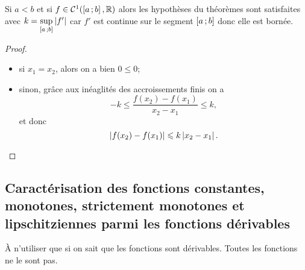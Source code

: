 Si $a < b$ et si $f \in \mathcal{C}^{1}(\left[ a \, ;  b \right], \mathbb{R})$ alors les hypothèses du théorèmes sont satisfaites avec $k=\sup\limits_{\left[ a \, ;  b \right]}\left\lvert f'\right\rvert$ car $f'$ est continue sur le segment $\left[ a \, ;  b \right]$ donc elle est bornée.

\begin{proof}
  \begin{itemize}
  \item si $x_1=x_2$, alors on a bien $0 \leqslant 0$;
  \item sinon, grâce aux inéaglités des accroissements finis on a
    \begin{equation}
      -k \leqslant \frac{f(x_2)-f(x_1)}{x_2-x_1} \leqslant k,
    \end{equation}
    et donc
    \begin{equation}
       \left\lvert f(x_2)-f(x_1)\right\rvert \leqslant k\left\lvert x_2-x_1\right\rvert.
    \end{equation}
  \end{itemize}
\end{proof}

\subsection{Caractérisation des fonctions constantes, monotones, strictement monotones et lipschitziennes parmi les fonctions dérivables}

À n'utiliser que si on sait que les fonctions sont dérivables. Toutes les fonctions ne le sont pas.

